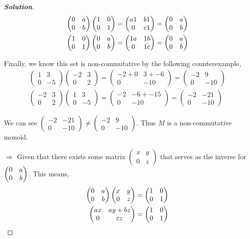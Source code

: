 \documentclass[11pt]{article}
\newenvironment{solution}{\begin{proof}[\textbf{\textit{Solution}}] }{\end{proof}}
\newcommand\m[1]{\begin{pmatrix}#1\end{pmatrix}}
\begin{document}
\begin{solution}
        \begin{align*}
            \pmat \idm = \begin{pmatrix} a1 & b1 \\ 0 & c1 \end{pmatrix} = \pmat \\
            \idm \pmat = \begin{pmatrix}1a & 1b \\ 0 & 1c \end{pmatrix} = \pmat 
        \end{align*}

        Finally, we know this set is non-commutative by the following counterexample,
        \begin{align*}
            \m{1&3\\0&-5} \m{-2&3\\0&2} = \m{-2+0 & 3+-6\\0 & -10} = \m{-2 & 9 \\ 0 & -10} \\
            \m{-2&3\\0&2} \m{1&3\\0&-5} = \m{-2 & -6 + -15 \\ 0 & -10} = \m{-2 & -21 \\ 0 & -10}
        \end{align*}

        We can see $\m{-2 & -21 \\ 0 & -10} \neq \m{-2 & 9 \\ 0 & -10}$. Thus $M$ is a non-commutative monoid. 

        $\Rightarrow$ Given that there exists some matrix $\begin{pmatrix}x & y \\ 0 & z \end{pmatrix}$ that serves as the inverse for $\pmat$. This means,
        \begin{align*}
            \pmat \begin{pmatrix}x & y \\ 0 & z \end{pmatrix} &= \begin{pmatrix}
            1 & 0 \\ 0 & 1
            \end{pmatrix} \\
            \begin{pmatrix}
                ax & ay + bz \\ 0 & cz 
            \end{pmatrix} &= \begin{pmatrix}
                1 & 0 \\ 0 & 1
            \end{pmatrix}
        \end{align*}


\end{solution}
\end{document}

